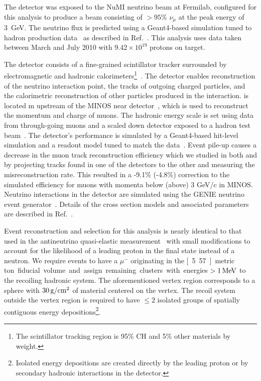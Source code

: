 
The \minerva detector was exposed to the NuMI neutrino beam at Fermilab, configured for this analysis to produce a beam consisting of $>95\%$ $\nu_\mu$ at the peak energy of 3~GeV. The neutrino flux is predicted 
using a Geant4-based simulation tuned to hadron production 
data~\cite{Alt:2006fr} as described in Ref.~\cite{nubarprl}.
This analysis uses data taken between March and July 2010 with
$9.42\times 10^{19}$ protons on target.

The \minerva detector consists of a fine-grained scintillator tracker
surrounded by electromagnetic and hadronic 
calorimeters\footnote{The \minerva scintillator tracking region is 95\% CH and 5\% other materials by weight.}~\cite{minerva_nim}. The detector enables 
reconstruction of the neutrino interaction point, 
the tracks of outgoing charged particles, 
and the calorimetric reconstruction of other particles produced in the interaction. 
\minerva is located \unit[2]{m} upstream of the 
MINOS near detector~\cite{Michael:2008bc}, which is used to 
reconstruct the momentum and charge of muons.
The hadronic energy scale is set
using data from through-going muons and a scaled down 
\minerva detector exposed to a hadron test beam~\cite{minerva_nim}.  
The detector's performance is simulated by a Geant4-based hit-level 
simulation and a readout model tuned to match the data~\cite{minerva_nim}.   
Event pile-up causes a decrease in the muon track reconstruction efficiency 
which we studied in both \minerva and \minos by projecting tracks 
found in one of the detectors to the other 
and measuring the misreconstruction rate. 
This resulted in a -9.1\% (-4.8\%) correction to the simulated 
efficiency for muons with momenta below (above) 3 GeV/c in MINOS.
Neutrino interactions in the detector are simulated using the 
GENIE neutrino event generator~\cite{Andreopoulos201087}.  Details of the cross section models and associated parameters are described in
Ref.~\cite{nubarprl}.  

Event reconstruction and selection for this analysis is nearly identical
to that used in the \minerva antineutrino quasi-elastic
measurement~\cite{nubarprl} with small modifications to account for
the likelihood of a leading proton in the final state instead of a neutron.  
We require events to have a $\mu^-$ originating in the 
\unit[5.57]{metric ton} fiducial volume and assign remaining clusters with 
energies $>\unit[1]{MeV}$ to the recoiling hadronic system. 
The aforementioned vertex region corresponds to a sphere with
$\unit[30]{g/cm^2}$ of material centered on the vertex. 
The recoil system outside the vertex region is required to have $\leq 2$ isolated groups of spatially contiguous energy depositions\footnote{Isolated energy depositions are created directly by the leading proton or by secondary hadronic interactions in the detector.}.

